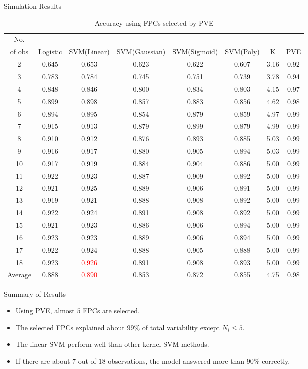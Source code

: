 \documentclass{beamer}
\begin{document}
\begin{frame}{Simulation Results}
	\begin{table}[ht]
		\caption{Accuracy using FPCs selected by PVE}
		\centering
		\tiny
		\begin{tabular}{cccccccc}
			\hline
			No. \\of obs & Logistic & SVM(Linear) & SVM(Gaussian) & SVM(Sigmoid) & SVM(Poly) & K & PVE \\ 
			\hline
			2 & 0.645 & 0.653 & 0.623 & 0.622 & 0.607 & 3.16 & 0.92 \\ 
			3 & 0.783 & 0.784 & 0.745 & 0.751 & 0.739 & 3.78 & 0.94 \\ 
			4 & 0.848 & 0.846 & 0.800 & 0.834 & 0.803 & 4.15 & 0.97 \\ 
			5 & 0.899 & 0.898 & 0.857 & 0.883 & 0.856 & 4.62 & 0.98 \\ 
			6 & 0.894 & 0.895 & 0.854 & 0.879 & 0.859 & 4.97 & 0.99 \\ 
			7 & 0.915 & 0.913 & 0.879 & 0.899 & 0.879 & 4.99 & 0.99 \\ 
			8 & 0.910 & 0.912 & 0.876 & 0.893 & 0.885 & 5.03 & 0.99 \\ 
			9 & 0.916 & 0.917 & 0.880 & 0.905 & 0.894 & 5.03 & 0.99 \\ 
			10 & 0.917 & 0.919 & 0.884 & 0.904 & 0.886 & 5.00 & 0.99 \\ 
			11 & 0.922 & 0.923 & 0.887 & 0.909 & 0.892 & 5.00 & 0.99 \\ 
			12 & 0.921 & 0.925 & 0.889 & 0.906 & 0.891 & 5.00 & 0.99 \\ 
			13 & 0.919 & 0.921 & 0.888 & 0.908 & 0.892 & 5.00 & 0.99 \\ 
			14 & 0.922 & 0.924 & 0.891 & 0.908 & 0.892 & 5.00 & 0.99 \\ 
			15 & 0.921 & 0.923 & 0.886 & 0.906 & 0.894 & 5.00 & 0.99 \\ 
			16& 0.923 & 0.923 & 0.889 & 0.906 & 0.894 & 5.00 & 0.99 \\ 
			17 & 0.922 & 0.924 & 0.888 & 0.905 & 0.888 & 5.00 & 0.99 \\ 
			18 & 0.923 & \textcolor{red}{0.926} & 0.891 & 0.908 & 0.893 & 5.00 & 0.99 \\ 
			\hline
			Average & 0.888 & \textcolor{red}{0.890} & 0.853 & 0.872 & 0.855 & 4.75 & 0.98 \\
			\hline
		\end{tabular}
	\end{table}
\end{frame}

\begin{frame}{Summary of Results}
	\begin{itemize}
		\item {
			Using PVE, almost $5$ FPCs are selected.
		}	
		\item {
			The selected FPCs explained about 99\% of total variability except $ N_i \le 5 $.
		}	
		\item {
			The linear SVM perform well than other kernel SVM methods.
		}
		\item {
			If there are about $7$ out of $18$ observations, the model answered more than 90\% correctly.
		}
	\end{itemize}
\end{frame}
\end{document}
